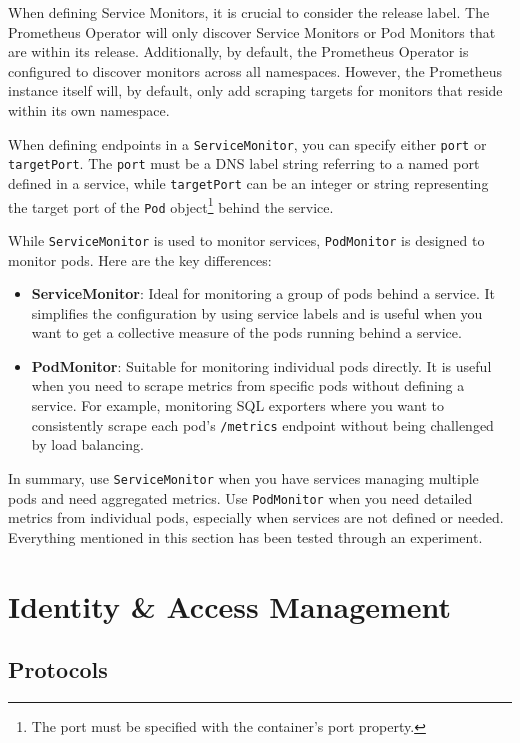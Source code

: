 When defining Service Monitors, it is crucial to consider the release label. The Prometheus Operator will only discover Service Monitors or Pod Monitors that are within its release. Additionally, by default, the Prometheus Operator is configured to discover monitors across all namespaces. However, the Prometheus instance itself will, by default, only add scraping targets for monitors that reside within its own namespace.

When defining endpoints in a \texttt{ServiceMonitor}, you can specify either \texttt{port} or \texttt{targetPort}. The \texttt{port} must be a DNS label string referring to a named port defined in a service, while \texttt{targetPort} can be an integer or string representing the target port of the \texttt{Pod} object\footnote{The port must be specified with the container's port property.} behind the service.

While \texttt{ServiceMonitor} is used to monitor services, \texttt{PodMonitor} is designed to monitor pods. Here are the key differences:

\begin{itemize}
    \item \textbf{ServiceMonitor}: Ideal for monitoring a group of pods behind a service. It simplifies the configuration by using service labels and is useful when you want to get a collective measure of the pods running behind a service.
    \item \textbf{PodMonitor}: Suitable for monitoring individual pods directly. It is useful when you need to scrape metrics from specific pods without defining a service. For example, monitoring SQL exporters where you want to consistently scrape each pod's \texttt{/metrics} endpoint without being challenged by load balancing.
\end{itemize}

In summary, use \texttt{ServiceMonitor} when you have services managing multiple pods and need aggregated metrics. Use \texttt{PodMonitor} when you need detailed metrics from individual pods, especially when services are not defined or needed. Everything mentioned in this section has been tested through an experiment.

\chapter{Identity \& Access Management}
\section{Protocols}

